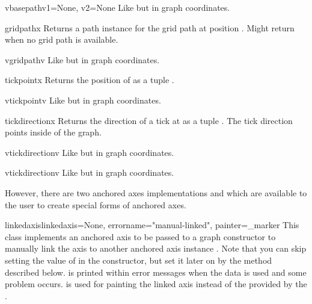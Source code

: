 \begin{methoddesc}{vbasepath}{v1=None, v2=None}
  Like  but in graph coordinates.
\end{methoddesc}

\begin{methoddesc}{gridpath}{x}
  Returns a path instance for the grid path at position .
  Might return  when no grid path is available.
\end{methoddesc}

\begin{methoddesc}{vgridpath}{v}
  Like  but in graph coordinates.
\end{methoddesc}

\begin{methoddesc}{tickpoint}{x}
  Returns the position of  as a tuple .
\end{methoddesc}

\begin{methoddesc}{vtickpoint}{v}
  Like  but in graph coordinates.
\end{methoddesc}

\begin{methoddesc}{tickdirection}{x}
  Returns the direction of a tick at  as a tuple .
  The tick direction points inside of the graph.
\end{methoddesc}

\begin{methoddesc}{vtickdirection}{v}
  Like  but in graph coordinates.
\end{methoddesc}

\begin{methoddesc}{vtickdirection}{v}
  Like  but in graph coordinates.
\end{methoddesc}

However, there are two anchored axes implementations
 and  which are available to
the user to create special forms of anchored axes.

\begin{classdesc}{linkedaxis}{linkedaxis=None, errorname="manual-linked", painter=_marker}
  This class implements an anchored axis to be passed to a graph
  constructor to manually link the axis to another anchored axis
  instance . Note that you can skip setting the value
  of  in the constructor, but set it later on by the
   method described below.  is
  printed within error messages when the data is used and some problem
  occurs.  is used for painting the linked axis instead
  of the  provided by the .
\end{classdesc}

